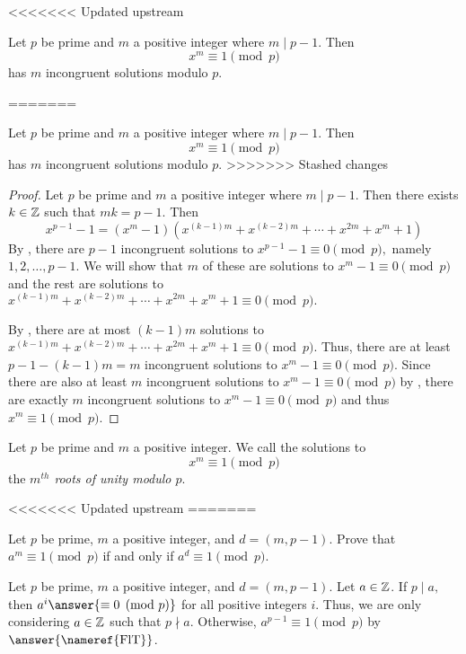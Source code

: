 \documentclass{ximera}
\begin{document}
<<<<<<< Updated upstream
    \begin{proposition}\label{prop:roots-unity}
        Let $p$ be prime and $m$ a positive integer where $m\mid p-1$. Then 
        \[
            x^m\equiv 1\pmod{p}
        \]
        has $m$ incongruent solutions modulo $p.$
    

=======
\begin{proposition}\label{prop:roots-unity}
    Let $p$ be prime and $m$ a positive integer where $m\mid p-1$. Then 
    \[
        x^m\equiv 1\pmod{p}
    \]
    has $m$ incongruent solutions modulo $p.$
>>>>>>> Stashed changes

    \begin{proof}
        Let $p$ be prime and $m$ a positive integer where $m\mid p-1$. Then there exists $k\in\mathbb Z$ such that $mk=p-1.$
        Then 
        \[
            x^{p-1}-1=(x^m-1)(x^{(k-1)m}+x^{(k-2)m}+\cdots+x^{2m}+x^m+1)
        \]
        By , there are $p-1$ incongruent solutions to $x^{p-1}-1\equiv0\pmod{p},$ namely $1,2,\dots,p-1.$ We will show that $m$ of these are solutions to 
        $x^m-1\equiv 0\pmod{p}$ and the rest are solutions to $x^{(k-1)m}+x^{(k-2)m}+\cdots+x^{2m}+x^m+1\equiv 0\pmod{p}.$

        By , there are at most $(k-1)m$ solutions to $x^{(k-1)m}+x^{(k-2)m}+\cdots+x^{2m}+x^m+1\equiv 0\pmod{p}.$ Thus, there are at least $p-1-(k-1)m=m$ incongruent solutions to $x^m-1\equiv 0\pmod{p}.$ 
        Since there are also at least $m$ incongruent solutions to $x^m-1\equiv 0\pmod{p}$ by , there are exactly $m$ incongruent solutions to $x^m-1\equiv 0\pmod{p}$ and thus $x^m\equiv 1\pmod{p}.$
    \end{proof}
\end{proposition}

\begin{definition}\label{def:root-unity}
    
    Let $p$ be prime and $m$ a positive integer. We call the solutions to  
        \[x^m\equiv 1\pmod{p}\]
    the \emph{$m^{th}$ roots of unity modulo $p.$}
\end{definition}


<<<<<<< Updated upstream
=======
\begin{br}\label{br:condition-root-unity}
    Let $p$ be prime, $m$ a positive integer, and $d=(m,p-1).$ Prove that $a^m\equiv 1\pmod{p}$ if and only if $a^d\equiv 1\pmod{p}.$


    \begin{solution}
        Let $p$ be prime, $m$ a positive integer, and $d=(m,p-1).$ Let $a\in\mathbb Z$. If $p\mid a,$ then $a^i\answer{\equiv 0\pmod{p}}$ for all positive integers $i$. 
        Thus, we are only considering $a\in\mathbb Z$ such that $p\nmid a.$
        Otherwise, $a^{p-1}\equiv 1\pmod{p}$ by $\answer{\textnormal{\nameref{FlT}}}$.
        

\end{solution}
\end{br}
\end{proposition}
\end{document}
